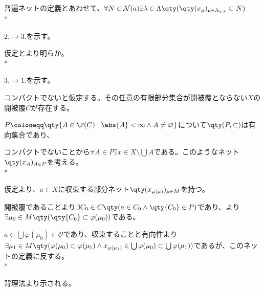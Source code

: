{  普遍ネットの定義とあわせて、$\forall N \in \mathcal{N}(a) \exists \lambda \in \Lambda \qty(\qty(x_\mu)_{\mu \in \Lambda_{\succcurlyeq \lambda}} \subset N)$\\*

  $2. \rightarrow 3.$を示す。

  仮定とより明らか。\\*

  $3. \rightarrow 1.$を示す。

  コンパクトでないと仮定する。その任意の有限部分集合が開被覆とならない$X$の開被覆$C$が存在する。

  $P \coloneqq \qty{A \in \P(C) \mid \abs{A} < \infty \land A \neq \varnothing}$について$\qty(P, \subset)$は有向集合であり、

  コンパクトでないことから$\forall A \in P \exists x \in X \setminus \bigcup A$である。このようなネット$\qty(x_A)_{A \in P}$を考える。\\*

  仮定より、$a \in X$に収束する部分ネット$\qty(x_{\varphi(\mu)})_{\mu \in M}$を持つ。

  開被覆であることより$\exists C_0 \in C \qty(a \in C_0 \land \qty{C_0} \in P)$であり、より$\exists \mu_0 \in M \qty(\qty{C_0} \subset \varphi(\mu_0))$である。

  $a \in \bigcup \varphi(\mu_0) \in \mathcal{O}$であり、収束することと有向性より$\exists \mu_1 \in M \qty(\varphi(\mu_0) \subset \varphi(\mu_1) \land x_{\varphi(\mu_1)} \in \bigcup \varphi(\mu_0) \subset \bigcup \varphi(\mu_1))$であるが、このネットの定義に反する。\\*

  背理法より示される。
}


